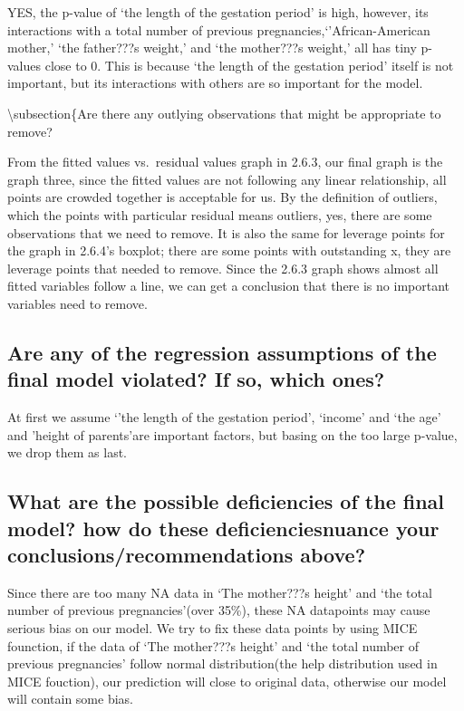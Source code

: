 \documentclass[]{article}
\begin{document}
YES, the p-value of `the length of the gestation period' is high,
however, its interactions with a total number of previous
pregnancies,`'African-American mother,' `the father???s weight,' and
`the mother???s weight,' all has tiny p-values close to 0. This is
because `the length of the gestation period' itself is not important,
but its interactions with others are so important for the model.

\textbackslash{}subsection\{Are there any outlying observations that
might be appropriate to remove?

From the fitted values vs.~residual values graph in 2.6.3, our final
graph is the graph three, since the fitted values are not following any
linear relationship, all points are crowded together is acceptable for
us. By the definition of outliers, which the points with particular
residual means outliers, yes, there are some observations that we need
to remove. It is also the same for leverage points for the graph in
2.6.4's boxplot; there are some points with outstanding x, they are
leverage points that needed to remove. Since the 2.6.3 graph shows
almost all fitted variables follow a line, we can get a conclusion that
there is no important variables need to remove.

\subsection{Are any of the regression assumptions of the final model violated? If so, which ones?}

At first we assume `'the length of the gestation period', `income' and
`the age' and 'height of parents'are important factors, but basing on
the too large p-value, we drop them as last.

\subsection{What are the possible deficiencies of the final model?   how do these deficienciesnuance your conclusions/recommendations above?}

Since there are too many NA data in `The mother???s height' and `the
total number of previous pregnancies'(over 35\%), these NA datapoints
may cause serious bias on our model. We try to fix these data points by
using MICE founction, if the data of `The mother???s height' and `the
total number of previous pregnancies' follow normal distribution(the
help distribution used in MICE fouction), our prediction will close to
original data, otherwise our model will contain some bias.
\end{document}
